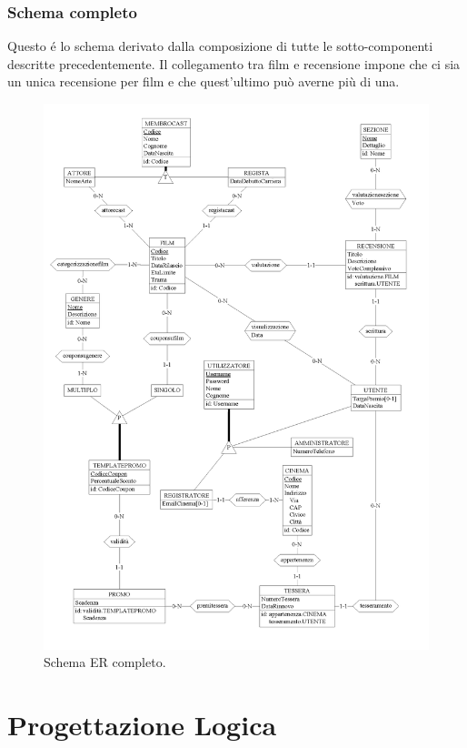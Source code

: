 \documentclass[a4paper,12pt]{report}
\begin{document}
	\subsection{Schema completo}
	Questo é lo schema derivato dalla composizione di tutte le sotto-componenti descritte precedentemente. Il collegamento tra film e recensione impone che ci sia un unica recensione per film e che quest'ultimo può averne più di una.
	\begin{figure}[H]
		\centering
		\includegraphics[width=430pt]{ER/ercompleto.png}
		\caption{Schema ER completo.}
	\end{figure}
	\chapter{Progettazione Logica}
\end{document}
